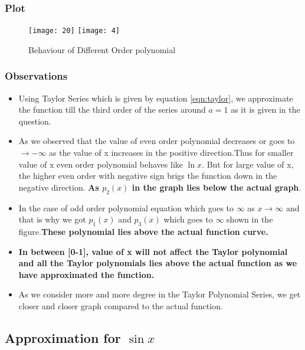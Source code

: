 \documentclass{article}
\begin{document}
\subsubsection{Plot}
\begin{figure}[!h]
    \centering
    \texttt{[image: 20]}
    \texttt{[image: 4]}
    \caption{Behaviour of Different Order polynomial}
    \label{fig:ques2}
\end{figure}

\subsubsection{Observations}
\begin{itemize}
    
    \item Using Taylor Series which is given by equation \ref{eqn:taylor}, we approximate the function till the third order of the series around $a = 1$ as it is given in the question.
    
    
    \item As we observed that the value of even order polynomial decreases or goes to $\to-\infty$  as the value of x increases in the positive direction.Thus for smaller value of x even order polynomial behaves like $\ln{x}$. But for large value of x, the higher even order with negative sign brigs the function down in the negative direction.  \textbf{As \textbf{$p_2(x)$} in the graph lies below the actual graph}. 
    
    \item In the case of odd order polynomial equation which goes to $\infty$ as $x\to\infty$ and that is why we got $p_1(x)$ and $p_3(x)$ which goes to $\infty$ shown in the figure.\textbf{These polynomial lies above the actual function curve.}
    
    \item \textbf{In between [0-1], value of x will not affect the Taylor polynomial and all the Taylor polynomials lies above the actual function as we have approximated the function.}
    
    \item As we consider more and more degree in the Taylor Polynomial Series, we get closer and closer graph compared to the actual function.
    
    
\end{itemize}
\newpage
\subsection{Approximation for $\sin{x}$}
\end{document}
